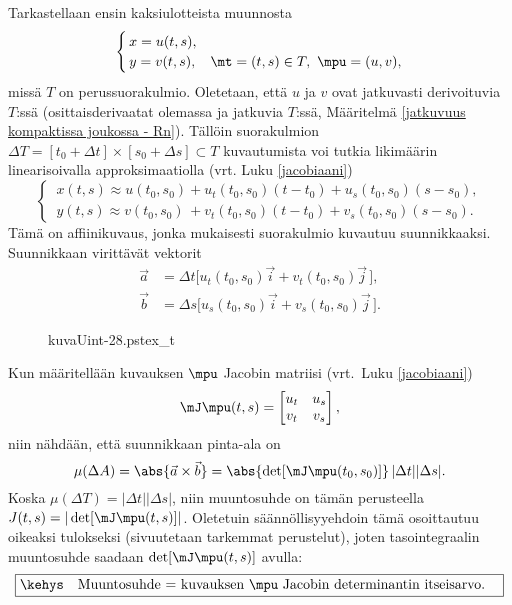 Tarkastellaan ensin kaksiulotteista muunnosta
\[
\begin{cases}
\,x=u(t,s), \\
\,y=v(t,s), &\mt=(t,s)\in T, \ \mpu=(u,v),
\end{cases}
\]
missä $T$ on perussuorakulmio. Oletetaan, että $u$ ja $v$ ovat jatkuvasti derivoituvia $T$:ssä
(osittaisderivaatat olemassa ja jatkuvia $T$:ssä, Määritelmä
\ref{jatkuvuus kompaktissa joukossa - Rn}). Tällöin suorakulmion
$\Delta T=[t_0+\Delta t]\times [s_0+\Delta s]\subset T$ kuvautumista voi tutkia likimäärin
linearisoivalla approksimaatiolla (vrt. Luku \ref{jacobiaani})
\[
\begin{cases}
\,x(t,s)\approx u(t_0,s_0)+u_t(t_0,s_0)(t-t_0)+u_s(t_0,s_0)(s-s_0), \\
\,y(t,s)\approx v(t_0,s_0)\,+v_t(t_0,s_0)(t-t_0)+v_s(t_0,s_0)(s-s_0).
\end{cases}
\]
Tämä on affiinikuvaus, jonka mukaisesti suorakulmio kuvautuu suunnikkaaksi. Suunnikkaan
virittävät vektorit
\begin{align*}
\vec a &= \Delta t\bigl[u_t(t_0,s_0)\vec i + v_t(t_0,s_0)\vec j\,\bigr], \\
\vec b &= \Delta s\bigl[u_s(t_0,s_0)\vec i + v_s(t_0,s_0)\vec j\,\bigr].
\end{align*}
\begin{figure}[H]
\begin{center}
{kuvaUint-28.pstex_t}
\end{center}
\end{figure}
Kun määritellään kuvauksen $\mpu$ Jacobin matriisi (vrt.\ Luku \ref{jacobiaani})
\[
\mJ\mpu(t,s)=\begin{bmatrix} u_t & u_s \\ v_t & v_s \end{bmatrix},
\]
niin nähdään, että suunnikkaan pinta-ala on
\[
\mu(\Delta A)=\abs{\vec a \times \vec b}=\abs{\det[\mJ\mpu(t_0,s_0)]}\,|\Delta t||\Delta s|.
\]
Koska $\mu(\Delta T)=|\Delta t||\Delta s|$, niin muuntosuhde on tämän perusteella
$J(t,s)=|\det[\mJ\mpu(t,s)]|$. Oletetuin säännöllisyyehdoin tämä osoittautuu oikeaksi
tulokseksi (sivuutetaan tarkemmat perustelut), joten tasointegraalin muuntosuhde saadaan
%
 $\det[\mJ\mpu(t,s)]$ avulla:
\[
\boxed{\kehys\quad 
       \text{Muuntosuhde = kuvauksen $\mpu$ Jacobin determinantin itseisarvo.} \quad}
\]


